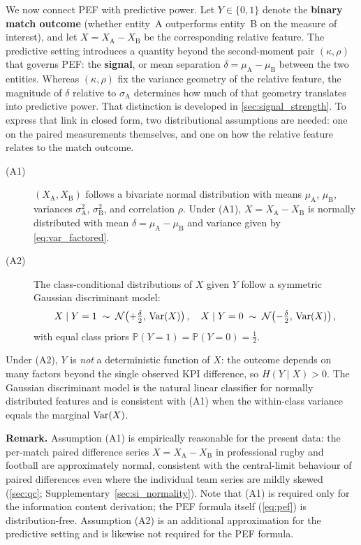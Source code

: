 We now connect PEF with predictive power. Let $Y\in\{0,1\}$ denote the \textbf{binary match outcome} (whether entity~A outperforms entity~B on the measure of interest), and let $X=X_{\mathrm{A}}-X_{\mathrm{B}}$ be the corresponding relative feature. The predictive setting introduces a quantity beyond the second-moment pair $(\kappa,\rho)$ that governs PEF: the \textbf{signal}, or mean separation $\delta=\mu_{\mathrm{A}}-\mu_{\mathrm{B}}$ between the two entities. Whereas $(\kappa,\rho)$ fix the variance geometry of the relative feature, the magnitude of $\delta$ relative to $\sigma_{\mathrm{A}}$ determines how much of that geometry translates into predictive power. That distinction is developed in \cref{sec:signal_strength}. To express that link in closed form, two distributional assumptions are needed: one on the paired measurements themselves, and one on how the relative feature relates to the match outcome.

\begin{description}
  \item[(A1)] $(X_{\mathrm{A}},X_{\mathrm{B}})$ follows a bivariate normal distribution with means $\mu_{\mathrm{A}}$, $\mu_{\mathrm{B}}$, variances $\sigma^{2}_{\mathrm{A}}$, $\sigma^{2}_{\mathrm{B}}$, and correlation $\rho$. Under (A1), $X=X_{\mathrm{A}}-X_{\mathrm{B}}$ is normally distributed with mean $\delta=\mu_{\mathrm{A}}-\mu_{\mathrm{B}}$ and variance given by \cref{eq:var_factored}.
  \item[(A2)] The class-conditional distributions of $X$ given $Y$ follow a symmetric Gaussian discriminant model:
  \[
    X \mid Y=1 \;\sim\; \mathcal{N}\!\left(+\tfrac{\delta}{2},\,\operatorname{Var}(X)\right),
    \quad
    X \mid Y=0 \;\sim\; \mathcal{N}\!\left(-\tfrac{\delta}{2},\,\operatorname{Var}(X)\right),
  \]
  with equal class priors $\mathbb{P}(Y=1)=\mathbb{P}(Y=0)=\tfrac{1}{2}$.
\end{description}

Under (A2), $Y$ is \emph{not} a deterministic function of $X$: the outcome depends on many factors beyond the single observed KPI difference, so $H(Y\mid X)>0$. The Gaussian discriminant model is the natural linear classifier for normally distributed features and is consistent with (A1) when the within-class variance equals the marginal $\operatorname{Var}(X)$.

\medskip
\noindent\textbf{Remark.} Assumption (A1) is empirically reasonable for the present data: the per-match paired difference series $X=X_{\mathrm{A}}-X_{\mathrm{B}}$ in professional rugby and football are approximately normal, consistent with the central-limit behaviour of paired differences even where the individual team series are mildly skewed (\cref{sec:qc}; Supplementary~\cref{sec:si_normality}). Note that (A1) is required only for the information content derivation; the PEF formula itself (\cref{eq:pef}) is distribution-free. Assumption (A2) is an additional approximation for the predictive setting and is likewise not required for the PEF formula.

